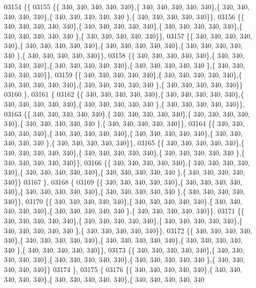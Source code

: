 \begin{DoxyCode}
03154 \{\{
03155 \{\{ 340, 340, 340, 340, 340\},\{ 340, 340, 340, 340, 340\},\{ 340, 340, 340, 340, 340\},\{ 340, 340, 340, 340, 340
      \},\{ 340, 340, 340, 340, 340\}\},
03156 \{\{ 340, 340, 340, 340, 340\},\{ 340, 340, 340, 340, 340\},\{ 340, 340, 340, 340, 340\},\{ 340, 340, 340, 340, 340
      \},\{ 340, 340, 340, 340, 340\}\},
03157 \{\{ 340, 340, 340, 340, 340\},\{ 340, 340, 340, 340, 340\},\{ 340, 340, 340, 340, 340\},\{ 340, 340, 340, 340, 340
      \},\{ 340, 340, 340, 340, 340\}\},
03158 \{\{ 340, 340, 340, 340, 340\},\{ 340, 340, 340, 340, 340\},\{ 340, 340, 340, 340, 340\},\{ 340, 340, 340, 340, 340
      \},\{ 340, 340, 340, 340, 340\}\},
03159 \{\{ 340, 340, 340, 340, 340\},\{ 340, 340, 340, 340, 340\},\{ 340, 340, 340, 340, 340\},\{ 340, 340, 340, 340, 340
      \},\{ 340, 340, 340, 340, 340\}\}
03160 \},
03161 \{
03162 \{\{ 340, 340, 340, 340, 340\},\{ 340, 340, 340, 340, 340\},\{ 340, 340, 340, 340, 340\},\{ 340, 340, 340, 340, 340
      \},\{ 340, 340, 340, 340, 340\}\},
03163 \{\{ 340, 340, 340, 340, 340\},\{ 340, 340, 340, 340, 340\},\{ 340, 340, 340, 340, 340\},\{ 340, 340, 340, 340, 340
      \},\{ 340, 340, 340, 340, 340\}\},
03164 \{\{ 340, 340, 340, 340, 340\},\{ 340, 340, 340, 340, 340\},\{ 340, 340, 340, 340, 340\},\{ 340, 340, 340, 340, 340
      \},\{ 340, 340, 340, 340, 340\}\},
03165 \{\{ 340, 340, 340, 340, 340\},\{ 340, 340, 340, 340, 340\},\{ 340, 340, 340, 340, 340\},\{ 340, 340, 340, 340, 340
      \},\{ 340, 340, 340, 340, 340\}\},
03166 \{\{ 340, 340, 340, 340, 340\},\{ 340, 340, 340, 340, 340\},\{ 340, 340, 340, 340, 340\},\{ 340, 340, 340, 340, 340
      \},\{ 340, 340, 340, 340, 340\}\}
03167 \},
03168 \{
03169 \{\{ 340, 340, 340, 340, 340\},\{ 340, 340, 340, 340, 340\},\{ 340, 340, 340, 340, 340\},\{ 340, 340, 340, 340, 340
      \},\{ 340, 340, 340, 340, 340\}\},
03170 \{\{ 340, 340, 340, 340, 340\},\{ 340, 340, 340, 340, 340\},\{ 340, 340, 340, 340, 340\},\{ 340, 340, 340, 340, 340
      \},\{ 340, 340, 340, 340, 340\}\},
03171 \{\{ 340, 340, 340, 340, 340\},\{ 340, 340, 340, 340, 340\},\{ 340, 340, 340, 340, 340\},\{ 340, 340, 340, 340, 340
      \},\{ 340, 340, 340, 340, 340\}\},
03172 \{\{ 340, 340, 340, 340, 340\},\{ 340, 340, 340, 340, 340\},\{ 340, 340, 340, 340, 340\},\{ 340, 340, 340, 340, 340
      \},\{ 340, 340, 340, 340, 340\}\},
03173 \{\{ 340, 340, 340, 340, 340\},\{ 340, 340, 340, 340, 340\},\{ 340, 340, 340, 340, 340\},\{ 340, 340, 340, 340, 340
      \},\{ 340, 340, 340, 340, 340\}\}
03174 \},
03175 \{
03176 \{\{ 340, 340, 340, 340, 340\},\{ 340, 340, 340, 340, 340\},\{ 340, 340, 340, 340, 340\},\{ 340, 340, 340, 340, 340

\end{DoxyCode}
